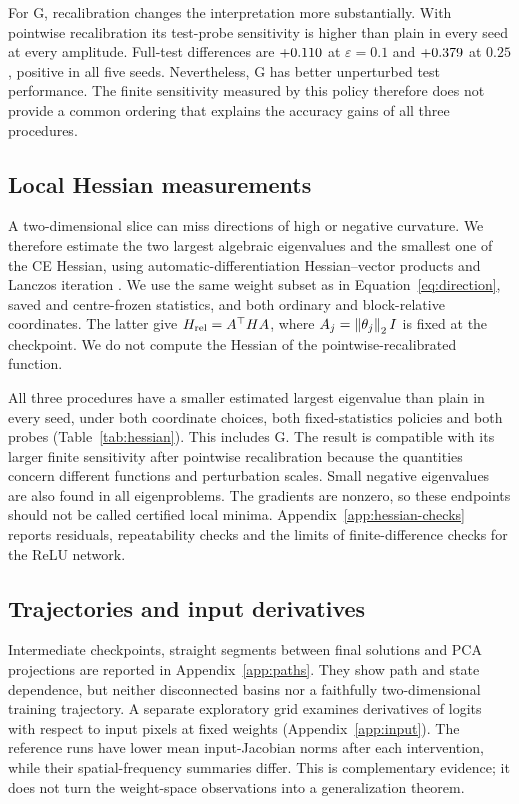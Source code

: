 For G, recalibration changes the interpretation more substantially. With pointwise recalibration its test-probe sensitivity is higher than plain in every seed at every amplitude. Full-test differences are $+0.110$ at $\varepsilon=0.1$ and $+0.379$ at $0.25$, positive in all five seeds. Nevertheless, G has better unperturbed test performance. The finite sensitivity measured by this policy therefore does not provide a common ordering that explains the accuracy gains of all three procedures.

\subsection{Local Hessian measurements}

A two-dimensional slice can miss directions of high or negative curvature. We therefore estimate the two largest algebraic eigenvalues and the smallest one of the CE Hessian, using automatic-differentiation Hessian--vector products and Lanczos iteration \citep{pearlmutter1994hessian,ghorbani2019hessian}. We use the same weight subset as in Equation~\eqref{eq:direction}, saved and centre-frozen statistics, and both ordinary and block-relative coordinates. The latter give $H_{\rm rel}=A^\top H A$, where $A_j=\left\lVert\theta_j\right\rVert_2 I$ is fixed at the checkpoint. We do not compute the Hessian of the pointwise-recalibrated function.

All three procedures have a smaller estimated largest eigenvalue than plain in every seed, under both coordinate choices, both fixed-statistics policies and both probes (Table~\ref{tab:hessian}). This includes G. The result is compatible with its larger finite sensitivity after pointwise recalibration because the quantities concern different functions and perturbation scales. Small negative eigenvalues are also found in all \tHessProblems{} eigenproblems. The gradients are nonzero, so these endpoints should not be called certified local minima. Appendix~\ref{app:hessian-checks} reports residuals, repeatability checks and the limits of finite-difference checks for the ReLU network.

\subsection{Trajectories and input derivatives}
Intermediate checkpoints, straight segments between final solutions and PCA projections are reported in Appendix~\ref{app:paths}. They show path and state dependence, but neither disconnected basins nor a faithfully two-dimensional training trajectory. A separate exploratory grid examines derivatives of logits with respect to input pixels at fixed weights (Appendix~\ref{app:input}). The reference runs have lower mean input-Jacobian norms after each intervention, while their spatial-frequency summaries differ. This is complementary evidence; it does not turn the weight-space observations into a generalization theorem.
